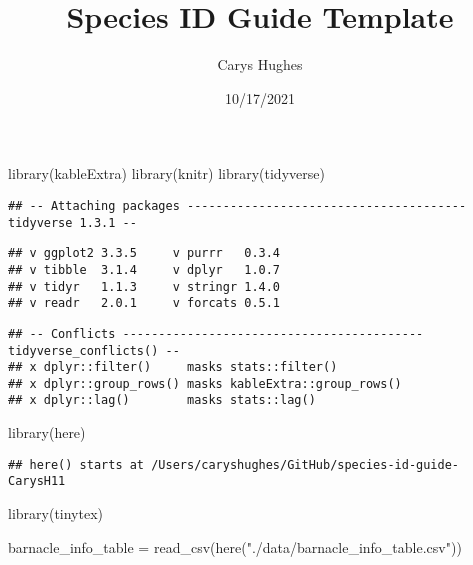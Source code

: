 \documentclass[
]{article}
\title{Species ID Guide Template}
\author{Carys Hughes}
\date{10/17/2021}
\newenvironment{Shaded}{\begin{snugshade}}{\end{snugshade}}
\newcommand{\FunctionTok}[1]{\textcolor[rgb]{0.00,0.00,0.00}{#1}}
\newcommand{\NormalTok}[1]{#1}
\newcommand{\OtherTok}[1]{\textcolor[rgb]{0.56,0.35,0.01}{#1}}
\newcommand{\StringTok}[1]{\textcolor[rgb]{0.31,0.60,0.02}{#1}}
\begin{document}
\maketitle

\begin{Shaded}
\begin{Highlighting}[]
\FunctionTok{library}\NormalTok{(kableExtra)}
\FunctionTok{library}\NormalTok{(knitr)}
\FunctionTok{library}\NormalTok{(tidyverse)}
\end{Highlighting}
\end{Shaded}

\begin{verbatim}
## -- Attaching packages --------------------------------------- tidyverse 1.3.1 --
\end{verbatim}

\begin{verbatim}
## v ggplot2 3.3.5     v purrr   0.3.4
## v tibble  3.1.4     v dplyr   1.0.7
## v tidyr   1.1.3     v stringr 1.4.0
## v readr   2.0.1     v forcats 0.5.1
\end{verbatim}

\begin{verbatim}
## -- Conflicts ------------------------------------------ tidyverse_conflicts() --
## x dplyr::filter()     masks stats::filter()
## x dplyr::group_rows() masks kableExtra::group_rows()
## x dplyr::lag()        masks stats::lag()
\end{verbatim}

\begin{Shaded}
\begin{Highlighting}[]
\FunctionTok{library}\NormalTok{(here)}
\end{Highlighting}
\end{Shaded}

\begin{verbatim}
## here() starts at /Users/caryshughes/GitHub/species-id-guide-CarysH11
\end{verbatim}

\begin{Shaded}
\begin{Highlighting}[]
\FunctionTok{library}\NormalTok{(tinytex)}

\NormalTok{barnacle\_info\_table }\OtherTok{=} \FunctionTok{read\_csv}\NormalTok{(}\FunctionTok{here}\NormalTok{(}\StringTok{"./data/barnacle\_info\_table.csv"}\NormalTok{))}
\end{Highlighting}
\end{Shaded}
\end{document}
